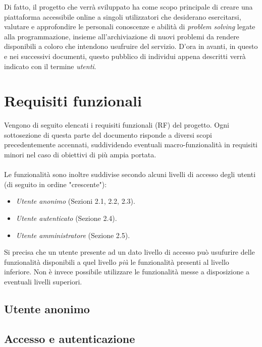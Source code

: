 \documentclass[11pt, a4paper]{article}
\theoremstyle{definition}
\begin{document}
Di fatto, il progetto che verrà sviluppato ha come scopo principale di
creare una piattaforma accessibile online a singoli utilizzatori che
desiderano esercitarsi, valutare e approfondire le personali
conoscenze e abilità di \textit{problem solving} legate alla programmazione,
insieme all'archiviazione di nuovi problemi da rendere disponibili a coloro
che intendono usufruire del servizio.
D'ora in avanti, in questo e nei successivi documenti, questo pubblico di
individui appena descritti verrà indicato con il termine \textit{utenti}.

\newpage
\section{Requisiti funzionali}
Vengono di seguito elencati i requisiti funzionali (RF)
del progetto. Ogni sottosezione di questa parte del documento
risponde a diversi scopi precedentemente accennati, suddividendo
eventuali macro-funzionalità in requisiti minori nel caso di obiettivi
di più ampia portata.
\\\\
\noindent Le funzionalità sono inoltre suddivise secondo alcuni livelli di accesso
degli utenti (di seguito in ordine "crescente"):
\begin{itemize}
    \item \textit{Utente anonimo} (Sezioni 2.1, 2.2, 2.3).
    \item \textit{Utente autenticato} (Sezione 2.4).
    \item \textit{Utente amministratore} (Sezione 2.5).
\end{itemize}
Si precisa che un utente presente ad un dato livello di accesso può usufurire
delle funzionalità disponibili a quel livello \textit{più} le funzionalità
presenti al livello inferiore. Non è invece possibile utilizzare le funzionalità
messe a disposizione a eventuali livelli superiori.

\begin{center}
\section*{Utente anonimo}    
\end{center}


\subsection{Accesso e autenticazione}
\end{document}
